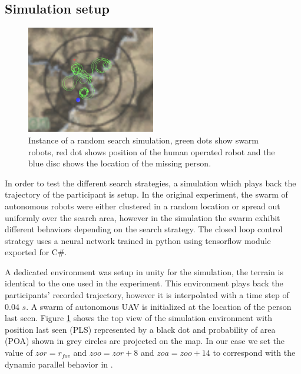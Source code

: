 \documentclass{article}
\begin{document}
\subsection{Simulation setup}

\begin{figure}[ht!]
\centering
\includegraphics[width=0.5\textwidth]{images/playBackScreenShot.png}
\caption[width=0.5\textwidth]{Instance of a random search simulation, green dots show swarm robots, red dot shows position of the human operated robot and the blue disc shows the location of the missing person.}
\label{fig:playBackSim}
\end{figure}

In order to test the different search strategies, a simulation which plays back the trajectory of the participant is setup. In the original experiment, the swarm of autonomous robots were either clustered in a random location or spread out uniformly over the search area, however in the simulation the swarm exhibit different behaviors depending on the search strategy. The closed loop control strategy uses a neural network trained in python using tensorflow module exported for C$\#$.

A dedicated environment was setup in unity for the simulation, the terrain is identical to the one used in the experiment. This environment plays back the participants' recorded trajectory, however it is interpolated with a time step of 0.04 $s$. A swarm of autonomous UAV is initialized at the location of the person last seen. Figure \ref{fig:playBackSim} shows the top view of the simulation environment with position last seen (PLS) represented by a black dot and probability of area (POA) shown in grey circles are projected on the map. In our case we set the value of $zor = r_{fov}$ and $zoo = zor + 8$ and $zoa = zoo + 14$ to correspond with the dynamic parallel behavior in \cite{Couzin}. 
\end{document}
